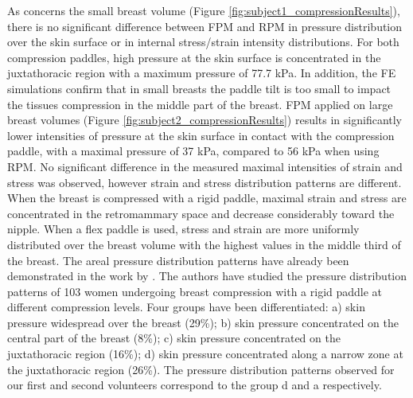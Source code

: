 As concerns the small breast volume (Figure \ref{fig:subject1_compressionResults}), there is no significant difference between FPM and RPM in pressure distribution over the skin surface or in internal stress/strain intensity distributions. For both compression paddles, high pressure at the skin surface is concentrated in the juxtathoracic region with a maximum pressure of 77.7 kPa. In addition, the FE simulations confirm that in small breasts the paddle tilt is too small to impact the tissues compression in the middle part of the breast. 
FPM applied on large breast volumes (Figure \ref{fig:subject2_compressionResults}) results in significantly lower intensities of pressure at the skin surface in contact with the compression paddle, with a maximal pressure of 37 kPa, compared to 56 kPa when using RPM. No significant difference in the measured maximal intensities of strain and stress was observed, however strain and stress distribution patterns are different. When the breast is compressed with a rigid paddle, maximal strain and stress are concentrated in the retromammary space and decrease considerably toward the nipple. When a flex paddle is used, stress and strain are more uniformly distributed over the breast volume with the highest values in the middle third of the breast.
The areal pressure distribution patterns have already been demonstrated in the work by \cite{dustler_breast_2012}. The authors have studied the pressure distribution patterns of 103 women undergoing breast compression with a rigid paddle at different compression levels. Four groups have been differentiated: a) skin pressure widespread over the breast (29\%); b) skin pressure concentrated on the central part of the breast (8\%); c) skin pressure concentrated on the juxtathoracic region (16\%); d) skin pressure concentrated along a narrow zone at the juxtathoracic region (26\%).  The pressure distribution patterns observed for our first and second volunteers correspond to the group d and a respectively.


